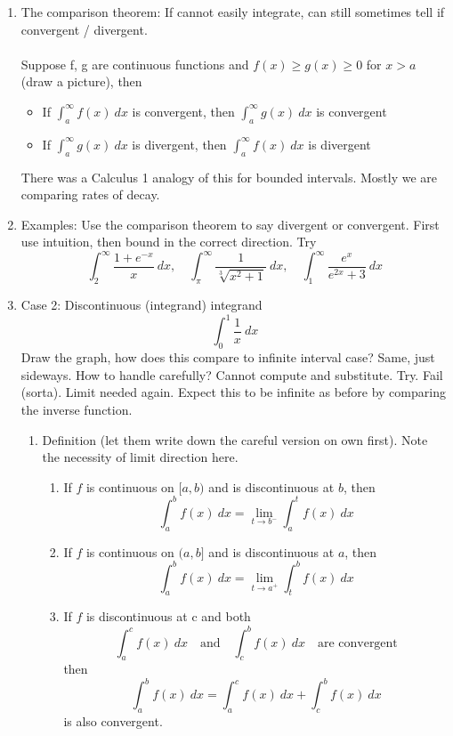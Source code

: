 \documentclass{article}
\begin{document}
\begin{enumerate}
\item The comparison theorem: If cannot easily integrate, can still sometimes tell if convergent / divergent. \\ \ \\
Suppose f, g are continuous functions and $f(x)\geq g(x)\geq 0$ for $x>a$ (draw a picture), then 
\begin{itemize}
\item If $\int_a^\infty f(x)~dx$ is convergent, then $\int_a^\infty g(x)~dx$ is convergent
\item If $\int_a^\infty g(x)~dx$ is divergent, then $\int_a^\infty f(x)~dx$ is divergent
\end{itemize}
There was a Calculus 1 analogy of this for bounded intervals. Mostly we are comparing rates of decay.

\item Examples: Use the comparison theorem to say divergent or convergent. First use intuition, then bound in the correct direction. Try 
$$
\int_2^{\infty}\frac{1+e^{-x}}{x}~dx,\quad
\int_{\pi}^{\infty} \frac{1}{\sqrt[3]{x^2+1}}~dx,\quad
\int_1^{\infty} \frac{e^x}{e^{2x}+3}~dx
$$

\item Case 2: Discontinuous (integrand) integrand
$$
\int_0^1\frac{1}{x}~dx
$$
Draw the graph, how does this compare to infinite interval case? Same, just sideways. How to handle carefully? Cannot compute and substitute. Try. Fail (sorta). Limit needed again. Expect this to be infinite as before by comparing the inverse function. 

\begin{enumerate}
\item Definition (let them write down the careful version on own first). Note the necessity of limit direction here.
\begin{enumerate}
\item If $f$ is continuous on $[a,b)$ and is discontinuous at $b$, then
$$\int_a^b f(x)~dx = \lim_{t\rightarrow b^- }\int_a^t f(x)~dx$$
\item If $f$ is continuous on $(a,b]$ and is discontinuous at $a$, then
$$\int_a^b f(x)~dx = \lim_{t\rightarrow a^+ }\int_t^b f(x)~dx$$
\item If $f$ is discontinuous at c and both 
$$\int_a^c f(x)~dx \quad \text{and} \quad\int_c^b f(x)~dx\quad\text{are convergent}$$
then
$$
\int_a^b f(x)~dx = \int_a^c f(x)~dx+\int_c^b f(x)~dx
$$
is also convergent.
\end{enumerate}	
\end{enumerate}


\end{enumerate}
\end{document}
